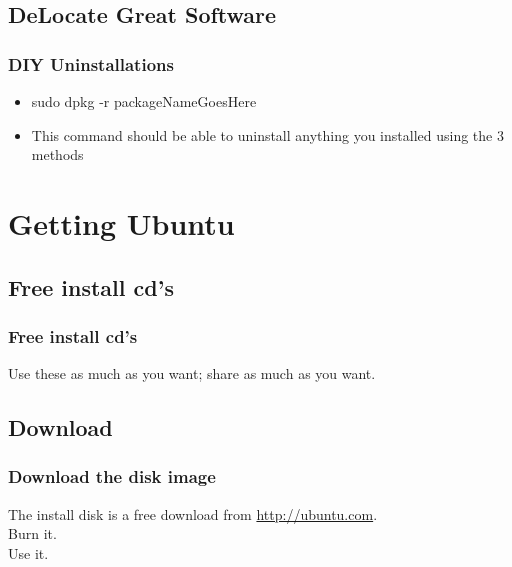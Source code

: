 \documentclass[hyperref={pdfpagelabels=false}]{beamer}
\begin{document}
\subsection{DeLocate Great Software}
\frame
{
	\frametitle{DIY Uninstallations}
	\begin{itemize}
	\item{sudo dpkg -r packageNameGoesHere}
	\item{This command should be able to uninstall anything you installed using the 3 methods}
	\end{itemize}

}
\section{Getting Ubuntu}
\subsection{Free install cd's}
\frame
{
    \frametitle{Free install cd's}
    Use these as much as you want; share as much as you want.
}
\subsection{Download}
\frame
{
    \frametitle{Download the disk image}
    The install disk is a free download from \url{http://ubuntu.com}.\\
    Burn it.\\
    Use it.
}
\end{document}
